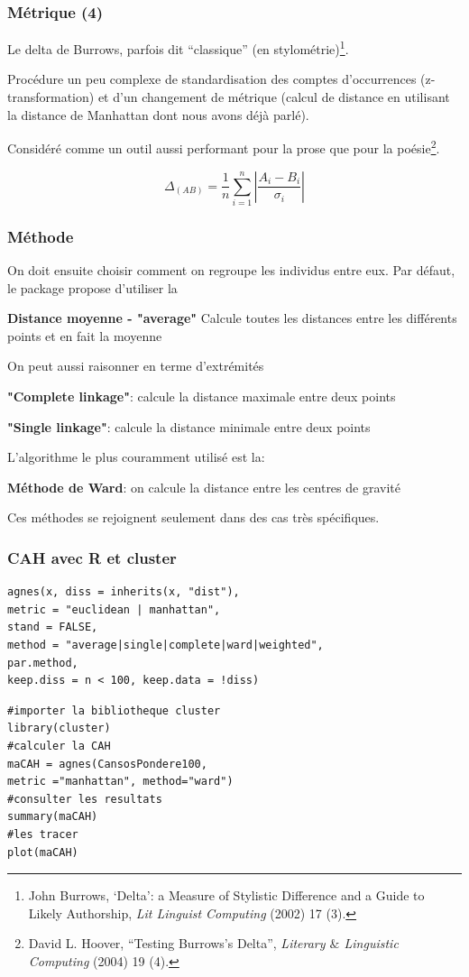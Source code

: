 \documentclass{beamer}
\begin{document}
\begin{frame}[fragile]
\frametitle{Métrique (4)}

Le delta de Burrows, parfois dit ``classique'' (en stylométrie)\footnote{%
John Burrows, ‘Delta’: a Measure of Stylistic Difference and a Guide to Likely Authorship, \textit{Lit Linguist Computing} (2002) 17 (3).
}.

Procédure un peu complexe de standardisation des comptes d'occurrences (z-transformation) et d'un changement de métrique (calcul de distance en utilisant la distance de Manhattan dont nous avons déjà parlé).

Considéré comme un outil aussi performant pour la prose que pour la poésie\footnote{%
David L. Hoover, ``Testing Burrows's Delta'', \textit{Literary $\&$ Linguistic Computing} (2004) 19 (4).
}.

\[
\Delta_{(AB)} = \frac{1}{n} \sum\limits_{i=1}^{n}
\left| \frac{A_i - B_i}{\sigma_i} \right|
\]


\end{frame}

\begin{frame}[fragile]
\frametitle{Méthode}

On doit ensuite choisir comment on regroupe les individus entre eux.
Par défaut, le package propose d'utiliser la

\textbf{Distance moyenne - "average"}  Calcule toutes les distances entre les différents points et en fait la moyenne

On peut aussi raisonner en terme d'extrémités 

\textbf{"Complete linkage"}: calcule la distance maximale entre deux points

\textbf{"Single linkage"}: calcule la distance minimale entre deux points

L'algorithme le plus couramment utilisé est la:

\textbf{Méthode de Ward}: on calcule la distance entre les centres de gravité 

Ces méthodes se rejoignent seulement dans des cas très spécifiques.

\end{frame}

\begin{frame}[fragile]
\frametitle{CAH avec R et cluster}

\begin{verbatim}
agnes(x, diss = inherits(x, "dist"), 
metric = "euclidean | manhattan",
stand = FALSE, 
method = "average|single|complete|ward|weighted",
par.method,
keep.diss = n < 100, keep.data = !diss)
\end{verbatim}

\begin{verbatim}
#importer la bibliotheque cluster
library(cluster)
#calculer la CAH
maCAH = agnes(CansosPondere100, 
metric ="manhattan", method="ward")
#consulter les resultats
summary(maCAH)
#les tracer
plot(maCAH)
\end{verbatim}

\end{frame}
\end{document}
